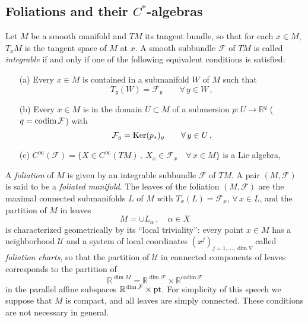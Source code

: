 \documentclass{beamer}
\theoremstyle{plain}
\newcommand{\sF}{\mathcal{F}}       %
\begin{document}
\begin{frame}
	\section{Foliations and their $C^*$-algebras}
\begin{definition}
	
	Let $M$ be a smooth manifold and $TM$ its tangent bundle, so that
	for each $x \in M$, $T_x M$ is the tangent space of $M$ at $x$. A
	smooth subbundle $\mathcal{F}$ of $TM$ is called {\it integrable} if and only if one of
	the following equivalent conditions is satisfied:
	
	\smallskip
	
	\begin{enumerate}
		
		\item[(a)] Every $x \in M$ is contained in a submanifold $W$ of $M$ such that
		$$
		T_y (W) = \mathcal{F}_y \qquad \forall \, y \in W \, ,
		$$
		
		\smallskip
		
		\item[(b)] Every $x \in M$ is in the domain $U \subset M$ of a
		submersion $p : U \to {\mathbb R}^q$ ($q = {\rm codim} \, \mathcal{F}$) with
		$$
		\mathcal{F}_y = {\rm Ker} (p_*)_y \qquad \forall \, y \in U \, ,
		$$
		
		\smallskip
		\item[(c)] $C^{\infty} \left( \mathcal{F}\right)  = \{ X \in C^{\infty} \left(TM\right) \, , \ X_x \in
		\mathcal{F}_x \quad \forall \, x \in M \}$ is a Lie algebra,
		
		\smallskip

	\end{enumerate}

\end{definition}


\end{frame}
\begin{frame}
A \textit{foliation} of $M$ is given by an integrable subbundle $\mathcal{F}$ of $TM$.  	A pair $\left(M, \sF\right)$ is said to be a \textit{foliated manifold}.
The leaves of the foliation $\left(M , \mathcal F\right)$ are the maximal connected
submanifolds $L$ of $M$ with $T_x (L) = \mathcal{F}_x $, $\forall \, x \in L$,
and the partition of $M$ in leaves $$M = \cup
L_{\alpha}\,,\quad\alpha \in X$$ is characterized geometrically by
its ``local triviality'': every point $x \in M$ has a neighborhood
$\mathcal U$ and a system of local coordinates
$(x^j)_{j = 1 , \ldots , \dim V}$ called
{\it foliation charts}, so
that the partition of $\mathcal U$ in connected components of
leaves corresponds to the partition of 
\begin{equation*}
	{\mathbb
		R}^{\dim M} = {\mathbb R}^{\dim \mathcal F} \times {\mathbb R}^{\text{codim}
		\, \mathcal F}
\end{equation*}
in the parallel affine subspaces 
$
{\mathbb R}^{\dim \mathcal F}
\times {\rm pt}$.
For simplicity of this speech we suppose that $M$ is compact, and all leaves are simply connected. These conditions are not necessary in general.
\end{frame}
\end{document}
